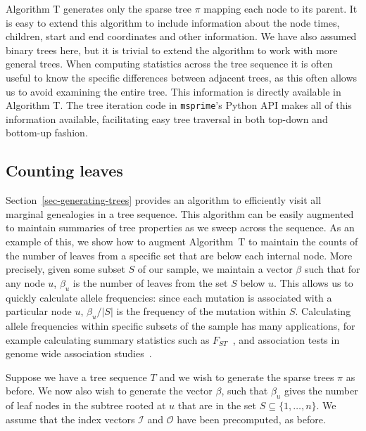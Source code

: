 \documentclass[10pt]{article}
\newcommand{\indexin}[0]{\ensuremath{\mathcal{I}}}
\newcommand{\indexout}[0]{\ensuremath{\mathcal{O}}}
\newcommand{\msprime}[0]{\texttt{msprime}}
\begin{document}
Algorithm T generates only the sparse tree $\pi$ mapping each node to its
parent. It is easy to extend this algorithm to include information about the
node times, children, start and end coordinates and other information. We have
also assumed binary trees here, but it is trivial to extend the algorithm  to work
with more general trees.  When computing statistics across the tree sequence it
is often useful to know the specific differences between adjacent trees, as
this often allows us to avoid examining the entire tree. This information is
directly available in Algorithm T.  The tree iteration code in \msprime's
Python API makes all of this information available, facilitating easy tree
traversal in both top-down and bottom-up fashion.

\subsection{Counting leaves}
\label{sec-counting-leaves}

Section~\ref{sec-generating-trees} provides an algorithm to efficiently visit
all marginal genealogies in a tree sequence. This algorithm can be easily
augmented to maintain summaries of tree properties as we sweep across the
sequence. As an example of this, we show how to augment Algorithm~T to maintain
the counts of the number of leaves from a specific set that are below each
internal node. More precisely, given some subset $S$ of our sample, we
maintain a vector $\beta$ such that for any node $u$, $\beta_u$ is
the number of leaves from the set $S$ below $u$. This allows us to
quickly calculate allele frequencies: since each mutation is associated
with a particular node $u$, $\beta_u / |S|$  is the frequency of the
mutation within $S$. Calculating allele frequencies within specific
subsets of the sample has many applications, for example calculating
summary statistics such as $F_{ST}$~\citep{cc10}, and association
tests in genome wide association studies~\citep{ssdm09}.

Suppose we have a tree sequence $T$ and we wish to generate
the sparse trees $\pi$ as before. We now also wish to generate the
vector $\beta$, such that $\beta_u$ gives the number of leaf nodes
in the subtree rooted at $u$ that are in the set $S \subseteq
\{1, \dots, n\}$. We assume that the index vectors $\indexin$ and
$\indexout$ have been precomputed, as before.
\end{document}
